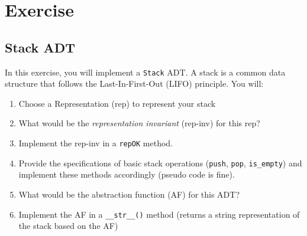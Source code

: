 \documentclass[oneside,11pt,dvipsnames]{book}
\newcommand{\code}[1]{\texttt{#1}}
\begin{document}
\section{Exercise}

\subsection{Stack ADT}\label{exercise:stack-adt}

In this exercise, you will implement a \code{Stack} ADT. A stack is a common data structure that follows the Last-In-First-Out (LIFO) principle. You will:
\begin{enumerate}
\item Choose a Representation (rep) to represent your stack
\item What would be the \emph{representation invariant} (rep-inv) for this rep? 
\item Implement the rep-inv in a \code{repOK} method.
\item Provide the specifications of basic stack operations (\code{push}, \code{pop}, \code{is\_empty}) and implement these methods accordingly (pseudo code is fine).
\item What would be the abstraction function (AF) for this ADT?
\item Implement the AF in a \code{\_\_str\_\_()} method (returns a string representation of the stack based on the AF)
\end{enumerate}
\end{document}
